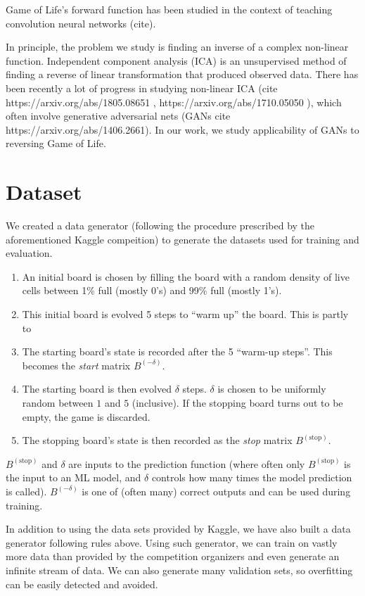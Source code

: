 \documentclass[conference]{IEEEtran}
\begin{document}
Game of Life's forward function has been studied in the context of teaching convolution neural networks (cite).

In principle, the problem we study is finding an inverse of a complex non-linear function.  Independent component analysis (ICA)  is an unsupervised method of finding a reverse of linear transformation that produced observed data. There has been recently a lot of progress in studying non-linear ICA (cite https://arxiv.org/abs/1805.08651 , https://arxiv.org/abs/1710.05050 ), which often involve generative adversarial nets (GANs cite https://arxiv.org/abs/1406.2661). In our work, we study applicability of GANs to reversing Game of Life.

\section{Dataset}

We created a data generator (following the procedure prescribed by the aforementioned Kaggle compeition) to generate the datasets used for training and evaluation.

\begin{enumerate}
\item An initial board is chosen by filling the board with a random density of live cells between 1\% full (mostly 0's) and 99\% full (mostly 1's).
\item This initial board is evolved 5 steps to ``warm up'' the board. This is partly to 
\item The starting board's state is recorded after the 5 ``warm-up steps''. This becomes the {\it start} matrix $B^{(-\delta)}$.
\item The starting board is then evolved $\delta$ steps. $\delta$ is chosen to be uniformly random between $1$ and $5$ (inclusive). If the stopping board turns out to be empty, the game is discarded.
\item The stopping board's state is then recorded as the {\it stop} matrix $B^{(\text{stop})}$.
\end{enumerate}

$B^{(\text{stop})}$ and $\delta$ are inputs to the prediction function (where often only $B^{(\text{stop})}$ is the input to an ML model, and $\delta$ controls how many times the model prediction is called). $B^{(-\delta)}$ is one of (often many) correct outputs and can be used during training.

In addition to using the data sets provided by Kaggle, we have also built a data generator following rules above. Using such generator, we can train on vastly more data than provided by the competition organizers and even generate an infinite stream of data. We can also generate many validation sets, so  overfitting can be easily detected and avoided.
\end{document}
